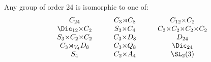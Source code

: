 \begin{mdframed}[align=center,nobreak=true]
    \begin{center}
        Any group of order 24 is isomorphic to one of:
        \begin{displaymath}
        \begin{array}{c@{\hskip 3em}c@{\hskip 3em}c}
            C_{24} & C_3{\rtimes}C_8 & C_{12}{\times}C_2 \\
            \Dic_{12}{\times}C_2 & S_3{\times}C_4 & C_3{\times}C_2{\times}C_2{\times}C_2 \\
            S_3{\times}C_2{\times}C_2 & C_3{\times}D_8 & D_{24} \\
            C_3{\rtimes_{V_4}}D_8 & C_3{\times}Q_8 & \Dic_{24} \\
            S_4 & C_2{\times}A_4 & \SL_2(3)
        \end{array}
        \end{displaymath}
    \end{center}
\end{mdframed}
